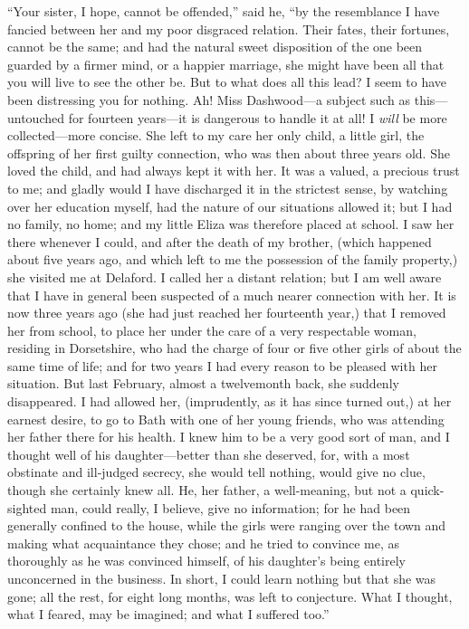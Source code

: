 ``Your sister, I hope, cannot be offended,'' said he,
``by the resemblance I have fancied between her and my
poor disgraced relation.  Their fates, their fortunes,
cannot be the same; and had the natural sweet
disposition of the one been guarded by a firmer mind,
or a happier marriage, she might have been all that you
will live to see the other be.  But to what does all this
lead?  I seem to have been distressing you for nothing.
Ah! Miss Dashwood---a subject such as this---untouched
for fourteen years---it is dangerous to handle it at all!
I \emph{will} be more collected---more concise.  She left to my care
her only child, a little girl, the offspring of her first
guilty connection, who was then about three years old.
She loved the child, and had always kept it with her.
It was a valued, a precious trust to me; and gladly
would I have discharged it in the strictest sense,
by watching over her education myself, had the nature
of our situations allowed it; but I had no family, no home;
and my little Eliza was therefore placed at school.
I saw her there whenever I could, and after the death of my
brother, (which happened about five years ago, and which
left to me the possession of the family property,) she
visited me at Delaford.  I called her a distant relation;
but I am well aware that I have in general been suspected
of a much nearer connection with her.  It is now three
years ago (she had just reached her fourteenth year,)
that I removed her from school, to place her under the care
of a very respectable woman, residing in Dorsetshire,
who had the charge of four or five other girls of about
the same time of life; and for two years I had every reason
to be pleased with her situation.  But last February,
almost a twelvemonth back, she suddenly disappeared.
I had allowed her, (imprudently, as it has since turned
out,) at her earnest desire, to go to Bath with one of
her young friends, who was attending her father there
for his health.  I knew him to be a very good sort of man,
and I thought well of his daughter---better than she deserved,
for, with a most obstinate and ill-judged secrecy,
she would tell nothing, would give no clue, though she
certainly knew all.  He, her father, a well-meaning,
but not a quick-sighted man, could really, I believe,
give no information; for he had been generally confined
to the house, while the girls were ranging over the town
and making what acquaintance they chose; and he tried
to convince me, as thoroughly as he was convinced himself,
of his daughter's being entirely unconcerned in the business.
In short, I could learn nothing but that she was gone;
all the rest, for eight long months, was left to conjecture.
What I thought, what I feared, may be imagined; and what I
suffered too.''

